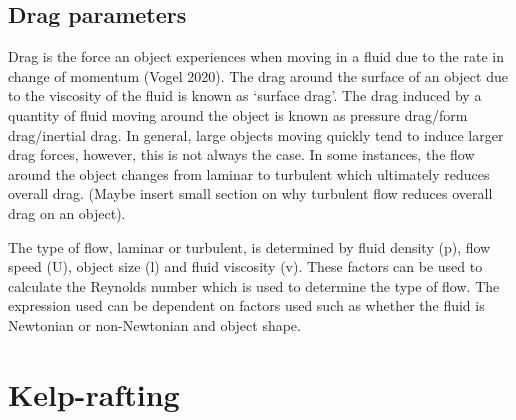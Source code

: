 \documentclass[
]{article}
\begin{document}
\hypertarget{drag-parameters}{%
\subsection{Drag parameters}\label{drag-parameters}}

Drag is the force an object experiences when moving in a fluid due to
the rate in change of momentum (Vogel 2020). The drag around the surface
of an object due to the viscosity of the fluid is known as `surface
drag'. The drag induced by a quantity of fluid moving around the object
is known as pressure drag/form drag/inertial drag. In general, large
objects moving quickly tend to induce larger drag forces, however, this
is not always the case. In some instances, the flow around the object
changes from laminar to turbulent which ultimately reduces overall drag.
(Maybe insert small section on why turbulent flow reduces overall drag
on an object).

The type of flow, laminar or turbulent, is determined by fluid density
(p), flow speed (U), object size (l) and fluid viscosity (v). These
factors can be used to calculate the Reynolds number which is used to
determine the type of flow. The expression used can be dependent on
factors used such as whether the fluid is Newtonian or non-Newtonian and
object shape.

\hypertarget{kelp-rafting}{%
\section{Kelp-rafting}\label{kelp-rafting}}
\end{document}
